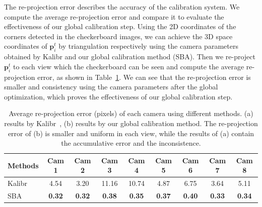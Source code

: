 The re-projection error describes the accuracy of the calibration system.
We compute the average re-projection error and compare it to evaluate the effectiveness of our global calibration step.
%
Using the 2D coordinates of the corners detected in the checkerboard images, we can achieve the 3D space coordinates of $\mathbf{p}^{t}_{i}$ by triangulation respectively using the camera parameters obtained by Kalibr and our global calibration method (SBA).
Then we re-project $\mathbf{p}^{t}_{i}$ to each view which the checkerboard can be seen and compute the average re-projection error, as shown in Table~\ref{tab:reprojection}.
We can see that the re-projection error is smaller and consistency using the camera parameters after the global optimization, which proves the effectiveness of our global calibration step.

\begin{table}
	\centering
	\caption{Average re-projection error (pixels) of each camera using different methods. (a) results by Kalibr~\cite{Maye2013Self}, (b) results by our global calibration method. The re-projection error of (b) is smaller and uniform in each view, while the results of (a) contain the accumulative error and the inconsistence.}
	\label{tab:reprojection}
	\begin{tabular}{l|cccccccc}
		\hline
		Methods & Cam 1 & Cam 2 & Cam 3 & Cam 4 & Cam 5 & Cam 6 & Cam 7 & Cam 8\\
		\hline
		Kalibr &4.54 &3.20 &11.16 &10.74 &4.87 &6.75 &3.64 &5.11\\
		
		SBA   &\textbf{0.32} &\textbf{0.32} &\textbf{0.38}  &\textbf{0.35} &\textbf{0.37} &\textbf{0.40} &\textbf{0.33} &\textbf{0.34} \\
		
		\hline
		
	\end{tabular}


\end{table}



